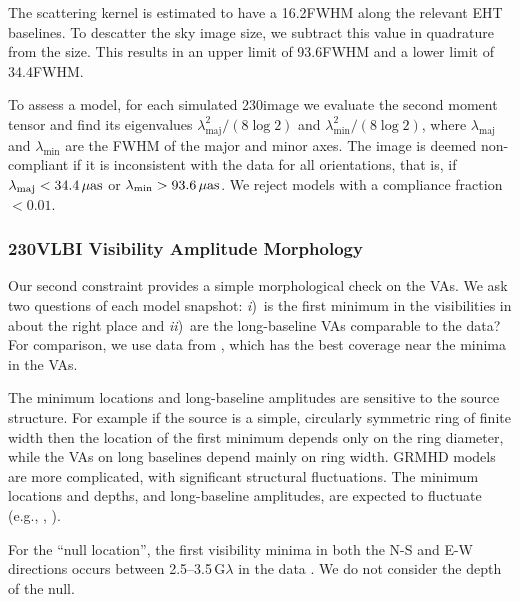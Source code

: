 The scattering kernel is estimated to have a 16.2\uas FWHM along the
relevant EHT baselines.
To descatter the sky image size, we subtract this value in quadrature
from the size.
This results in an upper limit of 93.6\uas FWHM and a lower limit of
34.4\uas FWHM.

To assess a model, for each simulated 230\GHz image we evaluate the
second moment tensor and find its eigenvalues
$\lambda_\mathrm{maj}^2/(8\log 2)$ and $\lambda_\mathrm{min}^2/(8\log
2)$, where $\lambda_\mathrm{maj}$ and $\lambda_\mathrm{min}$ are the
FWHM of the major and minor axes.
The image is deemed non-compliant if it is inconsistent with the data for
all orientations, that is, if $\lambda_\mathrm{maj} < 34.4\,\mathrm{\mu as}$ or
$\lambda_\mathrm{min} > 93.6\,\mathrm{\mu as}$.
We reject models with a compliance fraction $< 0.01$.

\subsubsection{230\GHz VLBI Visibility Amplitude Morphology}

Our second constraint provides a simple morphological check on the
VAs.
We ask two questions of each model snapshot: \emph{i})~is the first
minimum in the visibilities in about the right place and
\emph{ii})~are the long-baseline VAs comparable to the data?
For comparison, we use data from \aprilvii, which has the best \uv
coverage near the minima in the VAs.

The minimum locations and long-baseline amplitudes are sensitive to the
source structure.
For example if the source is a simple, circularly symmetric ring of
finite width then the location of the first minimum depends only on
the ring diameter, while the VAs on long baselines depend mainly on
ring width.
GRMHD models are more complicated, with significant structural
fluctuations.
The minimum locations and depths, and long-baseline amplitudes, are
expected to fluctuate (e.g., \citealt{2018ApJ...856..163M},
).

For the ``null location'', the first visibility minima in both the N-S
and E-W directions occurs between 2.5--3.5\,$\mathrm{G}\lambda$ in the
data .
We do not consider the depth of the null.

